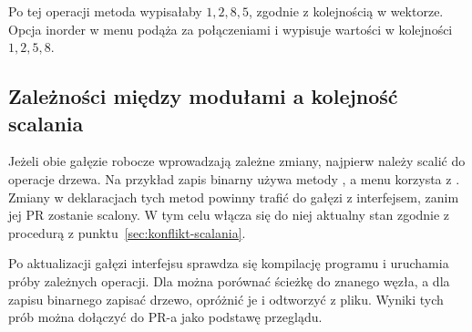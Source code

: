 Po tej operacji metoda  wypisałaby $1,2,8,5$,
zgodnie z kolejnością w wektorze. Opcja inorder w menu podąża
za połączeniami i wypisuje wartości w kolejności $1,2,5,8$.

\subsection{Zależności między modułami a kolejność scalania}
\label{sec:kolejnosc-scalania}

Jeżeli obie gałęzie robocze wprowadzają zależne zmiany, najpierw
należy scalić do  operacje drzewa. Na przykład zapis
binarny używa metody , a menu korzysta
z . Zmiany w deklaracjach tych metod powinny
trafić do gałęzi z interfejsem, zanim jej PR zostanie scalony.
W tym celu włącza się do niej aktualny stan 
zgodnie z procedurą z punktu~\ref{sec:konflikt-scalania}.

Po aktualizacji gałęzi interfejsu sprawdza się kompilację programu
i uruchamia próby zależnych operacji. Dla  można
porównać ścieżkę do znanego węzła, a dla zapisu binarnego
zapisać drzewo, opróżnić je i odtworzyć z pliku. Wyniki
tych prób można dołączyć do PR-a jako podstawę przeglądu.
